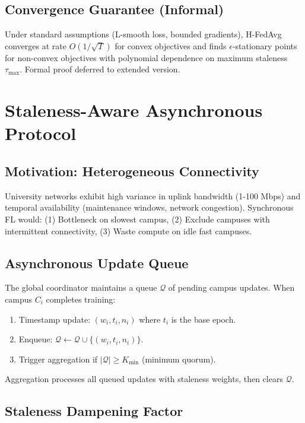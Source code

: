 \documentclass[conference]{IEEEtran}
\begin{document}
\subsection{Convergence Guarantee (Informal)}

Under standard assumptions (L-smooth loss, bounded gradients), H-FedAvg converges at rate $O(1/\sqrt{T})$ for convex objectives and finds $\epsilon$-stationary points for non-convex objectives with polynomial dependence on maximum staleness $\tau_{\max}$. Formal proof deferred to extended version.

\section{Staleness-Aware Asynchronous Protocol}

\subsection{Motivation: Heterogeneous Connectivity}

University networks exhibit high variance in uplink bandwidth (1-100 Mbps) and temporal availability (maintenance windows, network congestion). Synchronous FL would: (1) Bottleneck on slowest campus, (2) Exclude campuses with intermittent connectivity, (3) Waste compute on idle fast campuses.

\subsection{Asynchronous Update Queue}

The global coordinator maintains a queue $\mathcal{Q}$ of pending campus updates. When campus $C_i$ completes training:

\begin{enumerate}
    \item Timestamp update: $(w_i, t_i, n_i)$ where $t_i$ is the base epoch.
    \item Enqueue: $\mathcal{Q} \leftarrow \mathcal{Q} \cup \{(w_i, t_i, n_i)\}$.
    \item Trigger aggregation if $|\mathcal{Q}| \geq K_{\min}$ (minimum quorum).
\end{enumerate}

Aggregation processes all queued updates with staleness weights, then clears $\mathcal{Q}$.

\subsection{Staleness Dampening Factor}
\end{document}
